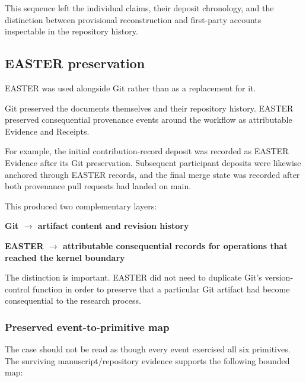 \documentclass[11pt]{article}
\begin{document}
This sequence left the individual claims, their deposit chronology, and the distinction between provisional reconstruction and first-party accounts inspectable in the repository history.

\subsection{EASTER preservation}

EASTER was used alongside Git rather than as a replacement for it.

Git preserved the documents themselves and their repository history. EASTER preserved consequential provenance events around the workflow as attributable Evidence and Receipts.

For example, the initial contribution-record deposit was recorded as EASTER Evidence after its Git preservation. Subsequent participant deposits were likewise anchored through EASTER records, and the final merge state was recorded after both provenance pull requests had landed on main.

This produced two complementary layers:

\textbf{Git $\rightarrow$ artifact content and revision history}

\textbf{EASTER $\rightarrow$ attributable consequential records for operations that reached the kernel boundary}

The distinction is important. EASTER did not need to duplicate Git's version-control function in order to preserve that a particular Git artifact had become consequential to the research process.

\subsubsection{Preserved event-to-primitive map}

The case should not be read as though every event exercised all six primitives. The surviving manuscript/repository evidence supports the following bounded map:
\end{document}
